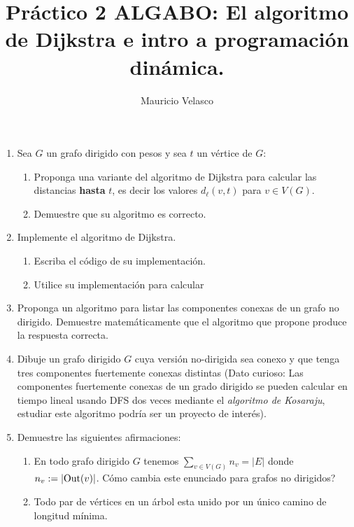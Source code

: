 \documentclass[12pt, a4paper]{article}
\date{}
\begin{document}
\title{Pr\'actico 2 ALGABO: El algoritmo de Dijkstra e intro a programaci\'on din\'amica.}
\author{Mauricio Velasco}
\maketitle{}
\begin{enumerate} 

\item Sea $G$ un grafo dirigido con pesos y sea $t$ un v\'ertice de $G$:
\begin{enumerate}
\item  Proponga una variante del algoritmo de Dijkstra para calcular las distancias {\bf hasta } $t$, es decir los valores $d_{\ell}(v,t)$ para $v\in V(G)$. 
\item Demuestre que su algoritmo es correcto.
\end{enumerate}

\item Implemente el algoritmo de Dijkstra.
\begin{enumerate}
\item Escriba el c\'odigo de su implementaci\'on.
\item Utilice su implementaci\'on para calcular 
\end{enumerate}


\item Proponga un algoritmo para listar las componentes conexas de un grafo no dirigido. Demuestre matem\'aticamente que el algoritmo que propone produce la respuesta correcta.

\item Dibuje un grafo dirigido $G$ cuya versi\'on no-dirigida sea conexo y que tenga tres componentes fuertemente conexas distintas (Dato curioso: Las componentes fuertemente conexas de un grado dirigido se pueden calcular en tiempo lineal usando DFS dos veces mediante el {\it algoritmo de Kosaraju}, estudiar este algoritmo podr\'ia ser un proyecto de inter\'es). 


\item Demuestre las siguientes afirmaciones:
\begin{enumerate}
\item En todo grafo dirigido $G$ tenemos $\sum_{v\in V(G)} n_v=|E|$ donde $n_v:=|{\rm Out}(v)|$. C\'omo cambia este enunciado para grafos no dirigidos?
\item Todo par de v\'ertices en un \'arbol esta unido por un \'unico camino de longitud m\'inima.  
\end{enumerate}


\end{enumerate}
\end{document}
